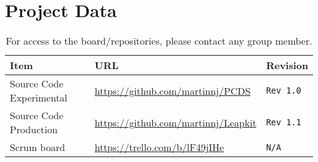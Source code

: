 \section{Project Data}

\begin{table}[h!]
    \begin{tabular}{l|l|l}
        \textbf{Item}            & \textbf{URL}                              & \textbf{Revision}\\\hline
        Source Code Experimental & \url{https://github.com/martinnj/PCDS}    & \texttt{Rev 1.0}\\
        Source Code Production   & \url{https://github.com/martinnj/Leapkit} & \texttt{Rev 1.1}\\
        Scrum board              & \url{https://trello.com/b/lF49jIHe}       & \texttt{N/A}
    \end{tabular}
    \label{tab:projdata}
    \caption{For access to the board/repositories, please contact any group member.}
\end{table}